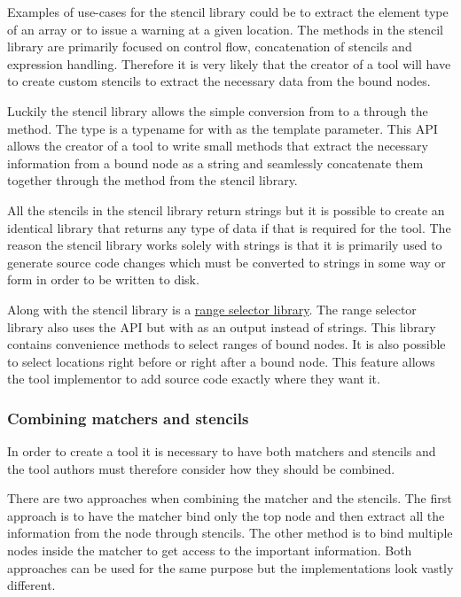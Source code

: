 Examples of use-cases for the stencil library could be to extract the element type of an array or to issue a warning at a given location. The methods in the stencil library are primarily focused on control flow, concatenation of stencils and expression handling. Therefore it is very likely that the creator of a tool will have to create custom stencils to extract the necessary data from the bound nodes.

Luckily the stencil library allows the simple conversion from  to a  through the  method. The  type is a typename for  with  as the template parameter. This API allows the creator of a tool to write small methods that extract the necessary information from a bound node as a string and seamlessly concatenate them together through the  method from the stencil library.

All the stencils in the stencil library return strings but it is possible to create an identical library that returns any type of data if that is required for the tool. The reason the stencil library works solely with strings is that it is primarily used to generate source code changes which must be converted to strings in some way or form in order to be written to disk. 

Along with the stencil library is a \href{https://github.com/llvm/llvm-project/blob/main/clang/include/clang/Tooling/Transformer/RangeSelector.h}{range selector library}. The range selector library also uses the  API but with  as an output instead of strings. This library contains convenience methods to select ranges of bound nodes. It is also possible to select locations right before or right after a bound node. This feature allows the tool implementor to add source code exactly where they want it.

\subsubsection*{Combining matchers and stencils}

In order to create a tool it is necessary to have both matchers and stencils and the tool authors must therefore consider how they should be combined.

There are two approaches when combining the matcher and the stencils. The first approach is to have the matcher bind only the top node and then extract all the information from the node through stencils. The other method is to bind multiple nodes inside the matcher to get access to the important information. Both approaches can be used for the same purpose but the implementations look vastly different.
 
